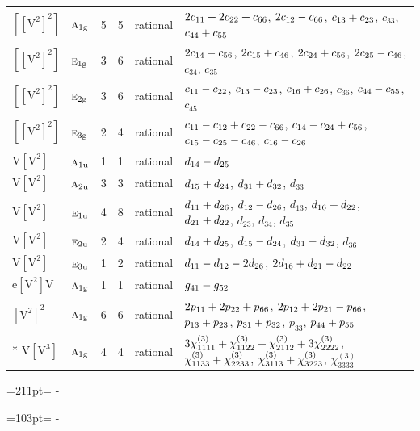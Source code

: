 \documentclass[10pt,a4paper]{article}
\newcommand{\needspace}[1]{\par\penalty-100\begingroup\dimen0=#1\relax\dimen2=\pagegoal
  \advance\dimen2-\pagetotal\ifdim\dimen0>\dimen2\relax\ifdim\dimen2>0pt\vfil\break\fi\fi
  \endgroup}
\numberwithin{equation}{section}
\newcommand{\irr}[1]{\text{\normalfont\scshape #1}}
\newcommand{\ptag}[1]{\mathrm{#1}}
\newcommand{\jahn}[1]{\mathrm{#1}}
\newlength{\fillwidth}\newlength{\cellwidth}\newlength{\colwidth}
\newcommand{\signbreak}{\penalty100\relax}
\begin{document}
{\begin{longtable}{@{}llrrl>{\RaggedRight\arraybackslash}p{\fillwidth}@{}}
$\jahn{[[V^{2}]^{2}]}$ & $\irr{a}_{1\ptag{g}}$ & 5 & 5 & rational & $2c_{11} +\signbreak 2c_{22} +\signbreak c_{66}$, $2c_{12} -\signbreak c_{66}$, $c_{13} +\signbreak c_{23}$, $c_{33}$, $c_{44} +\signbreak c_{55}$\\
$\jahn{[[V^{2}]^{2}]}$ & $\irr{e}_{1\ptag{g}}$ & 3 & 6 & rational & $2c_{14} -\signbreak c_{56}$, $2c_{15} +\signbreak c_{46}$, $2c_{24} +\signbreak c_{56}$, $2c_{25} -\signbreak c_{46}$, $c_{34}$, $c_{35}$\\
$\jahn{[[V^{2}]^{2}]}$ & $\irr{e}_{2\ptag{g}}$ & 3 & 6 & rational & $c_{11} -\signbreak c_{22}$, $c_{13} -\signbreak c_{23}$, $c_{16} +\signbreak c_{26}$, $c_{36}$, $c_{44} -\signbreak c_{55}$, $c_{45}$\\
$\jahn{[[V^{2}]^{2}]}$ & $\irr{e}_{3\ptag{g}}$ & 2 & 4 & rational & $c_{11} -\signbreak c_{12} +\signbreak c_{22} -\signbreak c_{66}$, $c_{14} -\signbreak c_{24} +\signbreak c_{56}$, $c_{15} -\signbreak c_{25} -\signbreak c_{46}$, $c_{16} -\signbreak c_{26}$\\
$\jahn{V[V^{2}]}$ & $\irr{a}_{1\ptag{u}}$ & 1 & 1 & rational & $d_{14} -\signbreak d_{25}$\\
$\jahn{V[V^{2}]}$ & $\irr{a}_{2\ptag{u}}$ & 3 & 3 & rational & $d_{15} +\signbreak d_{24}$, $d_{31} +\signbreak d_{32}$, $d_{33}$\\
$\jahn{V[V^{2}]}$ & $\irr{e}_{1\ptag{u}}$ & 4 & 8 & rational & $d_{11} +\signbreak d_{26}$, $d_{12} -\signbreak d_{26}$, $d_{13}$, $d_{16} +\signbreak d_{22}$, $d_{21} +\signbreak d_{22}$, $d_{23}$, $d_{34}$, $d_{35}$\\
$\jahn{V[V^{2}]}$ & $\irr{e}_{2\ptag{u}}$ & 2 & 4 & rational & $d_{14} +\signbreak d_{25}$, $d_{15} -\signbreak d_{24}$, $d_{31} -\signbreak d_{32}$, $d_{36}$\\
$\jahn{V[V^{2}]}$ & $\irr{e}_{3\ptag{u}}$ & 1 & 2 & rational & $d_{11} -\signbreak d_{12} -\signbreak 2d_{26}$, $2d_{16} +\signbreak d_{21} -\signbreak d_{22}$\\
$\jahn{e[V^{2}]V}$ & $\irr{a}_{1\ptag{g}}$ & 1 & 1 & rational & $\mathnormal{g}_{41} -\signbreak \mathnormal{g}_{52}$\\
$\jahn{[V^{2}]^{2}}$ & $\irr{a}_{1\ptag{g}}$ & 6 & 6 & rational & $2p_{11} +\signbreak 2p_{22} +\signbreak p_{66}$, $2p_{12} +\signbreak 2p_{21} -\signbreak p_{66}$, $p_{13} +\signbreak p_{23}$, $p_{31} +\signbreak p_{32}$, $p_{33}$, $p_{44} +\signbreak p_{55}$\\*
$\jahn{V[V^{3}]}$ & $\irr{a}_{1\ptag{g}}$ & 4 & 4 & rational & $3\chi^{(3)}_{1111} +\signbreak \chi^{(3)}_{1122} +\signbreak \chi^{(3)}_{2112} +\signbreak 3\chi^{(3)}_{2222}$, $\chi^{(3)}_{1133} +\signbreak \chi^{(3)}_{2233}$, $\chi^{(3)}_{3113} +\signbreak \chi^{(3)}_{3223}$, $\chi^{(3)}_{3333}$\\
\bottomrule\end{longtable}}
\needspace{211pt}
\needspace{103pt}
\end{document}
